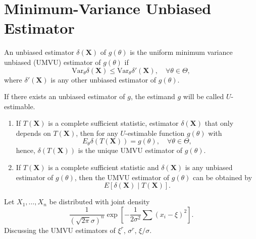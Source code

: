 \chapter{Minimum-Variance Unbiased Estimator}

\begin{definition}
    An unbiased estimator $\delta(\textbf{X})$ of $g(\theta)$ is the uniform minimum variance unbiased (UMVU) estimator of $g(\theta)$ if
    \begin{equation}
        \text{Var}_{\theta}\delta(\textbf{X})\leq\text{Var}_{\theta}\delta'(\textbf{X}),\quad\forall\theta\in\Theta,
    \end{equation}
    where $\delta'(\textbf{X})$ is any other unbiased estimator of $g(\theta)$.
\end{definition}

\begin{note}
    If there exists an unbiased estimator of $g$, the estimand $g$ will be called $U$-estimable.
\end{note}

\begin{enumerate}
    \item If $T(\textbf{X})$ is a complete sufficient statistic, estimator $\delta(\textbf{X})$ that only depends on $T(\textbf{X})$, then for any $U$-estimable function $g(\theta)$ with
          \begin{equation}
              E_{\theta}\delta(T(\textbf{X}))=g(\theta),\quad\forall\theta\in\Theta,
          \end{equation}
          hence, $\delta(T(\textbf{X}))$ is the unique UMVU estimator of $g(\theta)$.
    \item If $T(\textbf{X})$ is a complete sufficient statistic and $\delta({\textbf{X}})$ is any unbiased estimator of $g(\theta)$, then the UMVU estimator of $g(\theta)$ can be obtained by
          \begin{equation}
              E\left[\delta(\textbf{X})\mid T(\textbf{X})\right].
          \end{equation}
\end{enumerate}

\begin{example}
    Let $X_{1},\ldots,X_{n}$ be distributed with joint density
    \begin{equation}
        \frac{1}{(\sqrt{2\pi}\sigma)^{n}}\exp\left[-\frac{1}{2\sigma^{2}}\sum\left(x_{i}-\xi\right)^{2}\right].
    \end{equation}
    Discussing the UMVU estimators of $\xi^r$, $\sigma^r$, $\xi/\sigma$.
\end{example}

